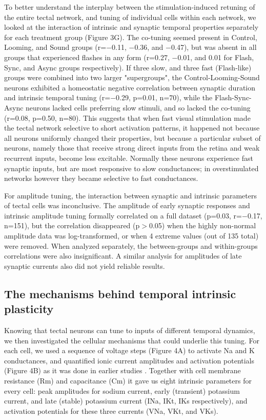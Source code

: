 \documentclass{article}
\begin{document}
To better understand the interplay between the stimulation-induced retuning of the entire tectal network, and tuning of individual cells within each network, we looked at the interaction of intrinsic and synaptic temporal properties separately for each treatment group (Figure 3G). The co-tuning seemed present in Control, Looming, and Sound groups (r=$-$0.11, $-$0.36, and $-$0.47), but was absent in all groups that experienced flashes in any form (r=0.27, $-$0.01, and 0.01 for Flash, Sync, and Async groups respectively). If three slow, and three fast (Flash-like) groups were combined into two larger "supergroups", the Control-Looming-Sound neurons exhibited a homeostatic negative correlation between synaptic duration and intrinsic temporal tuning (r=$-$0.29, p=0.01, n=70), while the Flash-Sync-Async neurons lacked cells preferring slow stimuli, and so lacked the co-tuning (r=0.08, p=0.50, n=80). This suggests that when fast visual stimulation made the tectal network selective to short activation patterns, it happened not because all neurons uniformly changed their properties, but because a particular subset of neurons, namely those that receive strong direct inputs from the retina and weak recurrent inputs, become less excitable. Normally these neurons experience fast synaptic inputs, but are most responsive to slow conductances; in overstimulated networks however they became selective to fast conductances.

For amplitude tuning, the interaction between synaptic and intrinsic parameters of tectal cells was inconclusive. The amplitude of early synaptic responses and intrinsic amplitude tuning formally correlated on a full dataset (p=0.03, r=$-$0.17, n=151), but the correlation disappeared (p$>$0.05) when the highly non-normal amplitude data was log-transformed, or when 4 extreme values (out of 135 total) were removed. When analyzed separately, the between-groups and within-groups correlations were also insignificant. A similar analysis for amplitudes of late synaptic currents also did not yield reliable results.

\subsection*{The mechanisms behind temporal intrinsic plasticity}

Knowing that tectal neurons can tune to inputs of different temporal dynamics, we then investigated the cellular mechanisms that could underlie this tuning. For each cell, we used a sequence of voltage steps (Figure 4A) to activate Na and K conductances, and quantified ionic current amplitudes and activation potentials (Figure 4B) as it was done in earlier studies \citep{ciarleglio2015}. Together with cell membrane resistance (Rm) and capacitance (Cm) it gave us eight intrinsic parameters for every cell: peak amplitudes for sodium current, early (transient) potassium current, and late (stable) potassium current (INa, IKt, IKs respectively), and activation potentials for these three currents (VNa, VKt, and VKs). 
\end{document}
